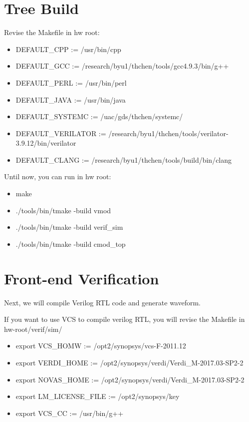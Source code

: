 \section{Tree Build}
Revise the Makefile in hw root: 
\begin{itemize}
    \item DEFAULT\_CPP  :=  /usr/bin/cpp
    \item DEFAULT\_GCC  :=  /research/byu1/thchen/tools/gcc4.9.3/bin/g++
    \item DEFAULT\_PERL :=  /usr/bin/perl
    \item DEFAULT\_JAVA := /usr/bin/java
    \item DEFAULT\_SYSTEMC := /uac/gds/thchen/systemc/
    \item DEFAULT\_VERILATOR := /research/byu1/thchen/tools/verilator-3.9.12/bin/verilator
    \item DEFAULT\_CLANG  := /research/byu1/thchen/tools/build/bin/clang
\end{itemize}

Until now, you can run in hw root:
\begin{itemize}
    \item make
    \item ./tools/bin/tmake -build vmod
    \item ./tools/bin/tmake -build verif\_sim
    \item ./tools/bin/tmake -build cmod\_top
\end{itemize}

\section{Front-end Verification}
Next, we will compile Verilog RTL code and generate waveform.

If you want to use VCS to compile verilog RTL, you will revise the Makefile in hw-root/verif/sim/
\begin{itemize}
    \item export VCS\_HOMW := /opt2/synopsys/vcs-F-2011.12
    \item export VERDI\_HOME := /opt2/synopsys/verdi/Verdi\_M-2017.03-SP2-2
    \item export NOVAS\_HOME := /opt2/synopsys/verdi/Verdi\_M-2017.03-SP2-2
    \item export LM\_LICENSE\_FILE := /opt2/synopsys/key
    \item export VCS\_CC := /usr/bin/g++
\end{itemize}

